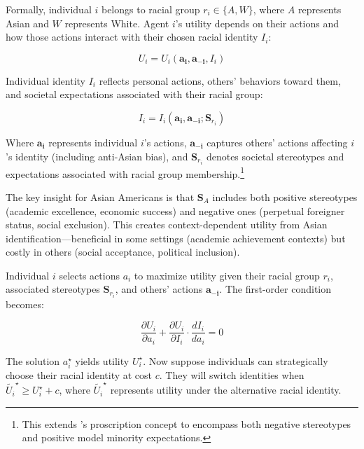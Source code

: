 Formally, individual $i$ belongs to racial group $r_i \in \{A, W\}$, where $A$ represents Asian and $W$ represents White. Agent $i$'s utility depends on their actions and how those actions interact with their chosen racial identity $I_i$:

\begin{equation}
U_i = U_i(\pmb{a_i}, \pmb{a_{-i}}, I_i)\label{eq:util}
\end{equation}

Individual identity $I_i$ reflects personal actions, others' behaviors toward them, and societal expectations associated with their racial group:

\begin{equation}
I_i = I_i(\pmb{a_i}, \pmb{a_{-i}}; \pmb{S}_{r_{i}})\label{eq:identity}
\end{equation}

Where $\pmb{a_i}$ represents individual $i$'s actions, $\pmb{a_{-i}}$ captures others' actions affecting $i$'s identity (including anti-Asian bias), and $\pmb{S}_{r_{i}}$ denotes societal stereotypes and expectations associated with racial group membership.\footnote{This extends \textcite{akerlofEconomicsIdentity2000}'s proscription concept to encompass both negative stereotypes and positive model minority expectations.}

The key insight for Asian Americans is that $\pmb{S}_{A}$ includes both positive stereotypes (academic excellence, economic success) and negative ones (perpetual foreigner status, social exclusion). This creates context-dependent utility from Asian identification—beneficial in some settings (academic achievement contexts) but costly in others (social acceptance, political inclusion).

Individual $i$ selects actions $a_i$ to maximize utility given their racial group $r_i$, associated stereotypes $\pmb{S}_{r_{i}}$, and others' actions $\pmb{a_{-i}}$. The first-order condition becomes:

\begin{equation}
\frac{\partial U_i}{\partial a_i} + \frac{\partial U_i}{\partial I_i} \cdot \frac{d I_i}{d a_i} = 0\label{eq:foc}
\end{equation}

The solution $a_{i}^{\star}$ yields utility $U_{i}^{\star}$. Now suppose individuals can strategically choose their racial identity at cost $c$. They will switch identities when $\tilde{U_{i}}^{\star} \geq U_{i}^{\star} + c$, where $\tilde{U_{i}}^{\star}$ represents utility under the alternative racial identity.

